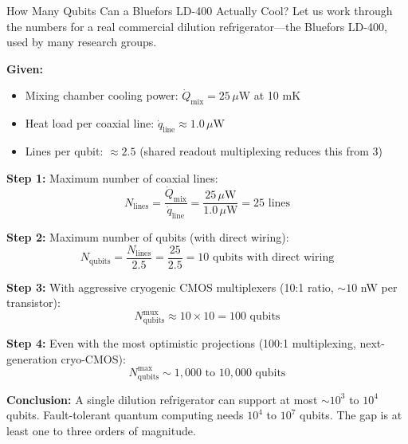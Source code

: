 \begin{examplebox}{How Many Qubits Can a Bluefors LD-400 Actually Cool?}
Let us work through the numbers for a real commercial dilution refrigerator---the Bluefors LD-400, used by many research groups.

\textbf{Given:}
\begin{itemize}
    \item Mixing chamber cooling power: $\dot{Q}_{\text{mix}} = 25\,\mu\text{W}$ at 10 mK
    \item Heat load per coaxial line: $\dot{q}_{\text{line}} \approx 1.0\,\mu\text{W}$
    \item Lines per qubit: $\approx 2.5$ (shared readout multiplexing reduces this from 3)
\end{itemize}

\textbf{Step 1:} Maximum number of coaxial lines:
\[
N_{\text{lines}} = \frac{\dot{Q}_{\text{mix}}}{\dot{q}_{\text{line}}} = \frac{25\,\mu\text{W}}{1.0\,\mu\text{W}} = 25 \text{ lines}
\]

\textbf{Step 2:} Maximum number of qubits (with direct wiring):
\[
N_{\text{qubits}} = \frac{N_{\text{lines}}}{2.5} = \frac{25}{2.5} = 10 \text{ qubits with direct wiring}
\]

\textbf{Step 3:} With aggressive cryogenic CMOS multiplexers (10:1 ratio, $\sim 10$ nW per transistor):
\[
N_{\text{qubits}}^{\text{mux}} \approx 10 \times 10 = 100 \text{ qubits}
\]

\textbf{Step 4:} Even with the most optimistic projections (100:1 multiplexing, next-generation cryo-CMOS):
\[
N_{\text{qubits}}^{\text{max}} \sim 1{,}000 \text{ to } 10{,}000 \text{ qubits}
\]

\textbf{Conclusion:} A single dilution refrigerator can support at most $\sim 10^3$ to $10^4$ qubits. Fault-tolerant quantum computing needs $10^4$ to $10^7$ qubits. The gap is at least one to three orders of magnitude.
\end{examplebox}

